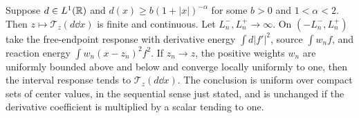 \begin{lemma}
\label{lem:center-neumann}
Suppose $d\in L^1(\mathbb R)$ and
$d(x)\ge b(1+|x|)^{-\alpha}$ for some $b>0$ and $1<\alpha<2$.
Then $z\mapsto\mathscr T_z(d\dd x)$ is finite and continuous.
Let $L_n^-,L_n^+\to\infty$. On $(-L_n^-,L_n^+)$ take the
free-endpoint response with derivative energy $\int d|f'|^2$,
source $\int w_nf$, and reaction energy $\int w_n(x-z_n)^2f^2$.
If $z_n\to z$, the positive weights $w_n$ are uniformly bounded
above and below and converge locally uniformly to one, then the
interval response tends to $\mathscr T_z(d\dd x)$. The conclusion
is uniform over compact sets of center values, in the sequential
sense just stated, and is unchanged if the derivative coefficient
is multiplied by a scalar tending to one.
\end{lemma}
